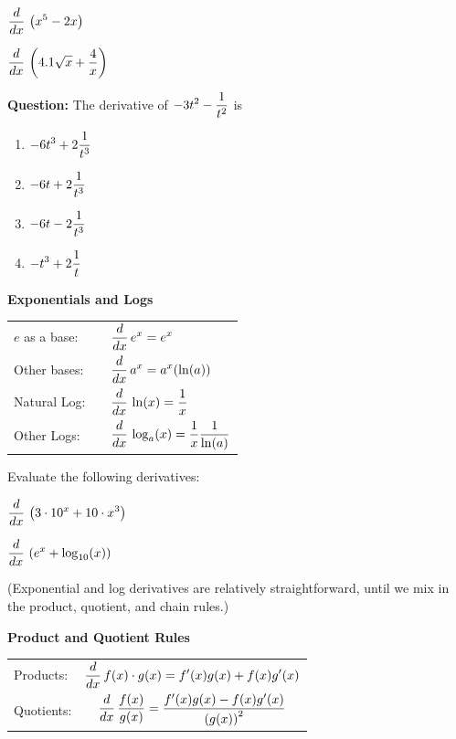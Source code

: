 $\displaystyle \frac{d}{dx} \, \left(x^{5} - 2 x\right)$

\vfill

$\displaystyle \frac{d}{dx} \, \left(4.1 \sqrt{x} + \frac{4}{x}\right)$

\vfill

\newpage
{\bf Question: } The derivative of $\displaystyle -3t^2 - \frac{1}{t^2}$ is 

\begin{enumerate}
\item $\displaystyle -6 t^3 + 2 \frac{1}{t^3} $ \\[1ex]
\item $\displaystyle -6 t + 2 \frac{1}{t^3} $ \\[1ex]
\item $\displaystyle -6 t - 2 \frac{1}{t^3} $ \\[1ex]
\item $\displaystyle -t^3 + 2 \frac{1}{t} $
\end{enumerate}

\newpage

\begin{boxnote}
{\bf Exponentials and Logs}
\begin{center}
\begin{tabular}{lp{0.2in}l}
$e$ as a base: && $\displaystyle \frac{d}{dx} \, e^x = e^x $ \\[7ex]
Other bases: && $\displaystyle \frac{d}{dx} \, a^x = a^x (\ln(a))$ \\[7ex]
Natural Log: && $\displaystyle \frac{d}{dx} \, \ln(x) = \frac{1}{x}$ \\[7ex]
Other Logs: &&$\displaystyle \frac{d}{dx} \, \log_a(x) = \frac{1}{x} \frac{1}{\ln(a)}$ \\[7ex]
\end{tabular}
\end{center}
\end{boxnote}

\newpage

\problem Evaluate the following derivatives:

$\displaystyle \frac{d}{dx} \, \left( 3 \cdot 10^x + 10 \cdot x^3  \right)$

\vfill

$\displaystyle \frac{d}{dx} \, \left( e^x + \log_{10}(x) \right)$

\vfill

(Exponential and log derivatives are relatively straightforward, until
we mix in the product, quotient, and chain rules.)

\newpage


\begin{boxnote}
{\bf Product and Quotient Rules}

\begin{center}
\begin{tabular}{lc}
  Products: & \LARGE $\displaystyle \frac{d}{dx} \, f(x) \cdot g(x) = f'(x) g(x) + f(x) g'(x)$ \\[1in]
  Quotients: &\LARGE  $\displaystyle \frac{d}{dx} \, \frac{f(x)}{g(x)} = \frac{f'(x) g(x) - f(x) g'(x)}{\left(g(x) \right)^2}$ \\ 
\end{tabular}
\end{center}



\end{boxnote}

